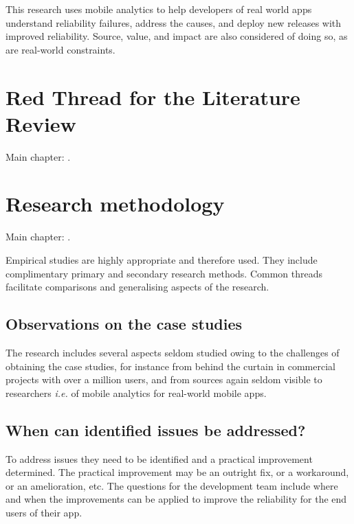 This research uses mobile analytics to help developers of real world apps understand reliability failures, address the causes, and deploy new releases with improved reliability. %
Source, value, and impact are also considered of doing so, as are real-world constraints. %


\section{Red Thread for the Literature Review}
Main chapter: .


\section[Research methodology]{Research methodology}
Main chapter: . 

Empirical studies are highly appropriate and therefore used. They include complimentary primary and secondary research methods. Common threads facilitate comparisons and generalising aspects of the research. %


\clearpage


\subsection{Observations on the case studies}
The research includes several aspects seldom studied owing to the challenges of obtaining the case studies, for instance from behind the curtain in commercial projects with over a million users, and from sources again seldom visible to researchers \emph{i.e.} of mobile analytics for real-world mobile apps.


\clearpage 
\subsection{When can identified issues be addressed?}
To address issues they need to be identified and a practical improvement determined. The practical improvement may be an outright fix, or a workaround, or an amelioration, etc. The questions for the development team include where and when the improvements can be applied to improve the reliability for the end users of their app.

